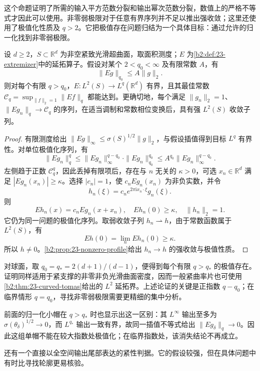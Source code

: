 这个命题证明了所需的输入平方范数分裂和输出幂次范数分裂，数值上的严格不等式才因此可以使用。非零弱极限对于任意有界序列并不足以推出强收敛；这里还使用了极值化性质及 \(q>2\)。它把极值存在问题归结为一个具体目标：通过允许的归一化找到非零弱极限。

\begin{theorem}[较大输出指数下的极值存在]\label{b2:thm:23-supercritical-extremizer}
设 \(d\geq2\)，\(S\subset\mathbb R^d\) 为非空紧致光滑超曲面，取面积测度；\(E\) 为\cref{b2:def:23-extremizer}中的延拓算子。假设对某个 \(2<q_0<\infty\) 及有限常数 \(A\)，有
\[
 \|Eg\|_{q_0}\leq A\|g\|_2.
\]
则对每个有限 \(q>q_0\)，\(E:L^2(S)\to L^q(\mathbb R^d)\) 有界，且其最佳常数
\(\mathcal C_q=\sup_{\|f\|_2=1}\|Ef\|_q\)
都能达到。更确切地，每个满足 \(\|g_n\|_2=1\)、\(\|Eg_n\|_q\to\mathcal C_q\) 的序列，在适当调制和常数相位变换后，具有强 \(L^2(S)\) 收敛子列。
\end{theorem}
\begin{proof}
有限测度给出 \(\|Eg\|_\infty\leq\sigma(S)^{1/2}\|g\|_2\)，与假设插值得到目标 \(L^q\) 有界性。对单位极值化序列，有
\[
 \|Eg_n\|_q^q
 \leq\|Eg_n\|_\infty^{q-q_0}\cdot\|Eg_n\|_{q_0}^{q_0}
 \leq A^{q_0}\|Eg_n\|_\infty^{q-q_0}.
\]
左侧趋于正数 \(\mathcal C_q^q\)，因此丢掉有限项后，存在与 \(n\) 无关的 \(\kappa>0\)，可选 \(x_n\in\mathbb R^d\) 满足 \(|Eg_n(x_n)|\geq\kappa\)。选择 \(|c_n|=1\)，使 \(c_nEg_n(x_n)\) 为非负实数，并令
\[
 h_n(\xi)=c_ne^{2\pi\mathrm i x_n\cdot\xi}g_n(\xi).
\]
则
\[
 Eh_n(x)=c_nEg_n(x+x_n),\quad
 Eh_n(0)\geq\kappa,\quad \|h_n\|_2=1.
\]
它仍为同一问题的极值化序列。取弱收敛子列 \(h_n\rightharpoonup h\)，由于常数函数属于 \(L^2(S)\)，有
\[
 Eh(0)=\lim_n Eh_n(0)\geq\kappa.
\]
所以 \(h\neq0\)。\cref{b2:prop:23-nonzero-profile}给出 \(h_n\to h\) 的强收敛与极值性质。
\end{proof}

对球面，取 \(q_0=q_*=2(d+1)/(d-1)\)，便得到每个有限 \(q>q_*\) 的极值存在。证明同样适用于紧支撑的非零非负光滑曲面密度，因而一般紧曲率片也可使用\cref{b2:thm:23-curved-tomas}给出的 \(L^2\) 延拓界。上述论证的关键是正指数 \(q-q_0\)；在临界情形 \(q=q_0\)，寻找非零弱极限需要更精细的集中分析。

\ProseParagraphBreak
前面的归一化小帽在 \(q>q_*\) 时也显示出这一区别：其 \(L^\infty\) 输出至多为 \(\sigma(\theta_\delta)^{1/2}\to0\)，而 \(L^{q_*}\) 输出一致有界，故同一插值不等式给出 \(\|Eg_\delta\|_q\to0\)。因此这组单帽不能在较大指数处极值化；在临界指数处，该消失结论不再成立。

还有一个直接以全空间输出尾部表达的紧性判据。它的假设较强，但在具体问题中有时比寻找轮廓更易核验。

